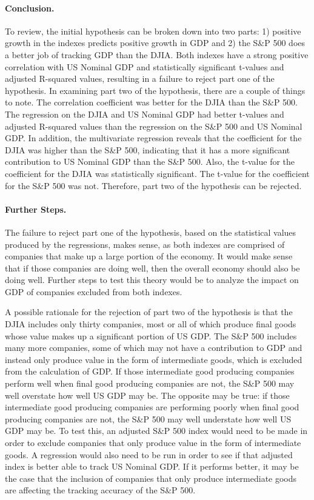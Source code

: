 \documentclass[11pt]{article}
\numberwithin{equation}{section}
\begin{document}
\paragraph{Conclusion.}
To review, the initial hypothesis can be broken down into two parts: 1) positive growth in the indexes predicts positive growth in GDP and 2) the S\&P 500 does a better job of tracking GDP than the DJIA. Both indexes have a strong positive correlation with US Nominal GDP and statistically significant t-values and adjusted R-squared values, resulting in a failure to reject part one of the hypothesis. In examining part two of the hypothesis, there are a couple of things to note. The correlation coefficient was better for the DJIA than the S\&P 500. The regression on the DJIA and US Nominal GDP had better t-values and adjusted R-squared values than the regression on the S\&P 500 and US Nominal GDP. In addition, the multivariate regression reveals that the coefficient for the DJIA was higher than the S\&P 500, indicating that it has a more significant contribution to US Nominal GDP than the S\&P 500. Also, the t-value for the coefficient for the DJIA was statistically significant. The t-value for the coefficient for the S\&P 500 was not. Therefore, part two of the hypothesis can be rejected.

\paragraph{Further Steps.}
The failure to reject part one of the hypothesis, based on the statistical values produced by the regressions, makes sense, as both indexes are comprised of companies that make up a large portion of the economy. It would make sense that if those companies are doing well, then the overall economy should also be doing well. Further steps to test this theory would be to analyze the impact on GDP of companies excluded from both indexes.

A possible rationale for the rejection of part two of the hypothesis is that the DJIA includes only thirty companies, most or all of which produce final goods whose value makes up a significant portion of US GDP. The S\&P 500 includes many more companies, some of which may not have a contribution to GDP and instead only produce value in the form of intermediate goods, which is excluded from the calculation of GDP. If those intermediate good producing companies perform well when final good producing companies are not, the S\&P 500 may well overstate how well US GDP may be. The opposite may be true: if those intermediate good producing companies are performing poorly when final good producing companies are not, the S\&P 500 may well understate how well US GDP may be. To test this, an adjusted S\&P 500 index would need to be made in order to exclude companies that only produce value in the form of intermediate goods. A regression would also need to be run in order to see if that adjusted index is better able to track US Nominal GDP. If it performs better, it may be the case that the inclusion of companies that only produce intermediate goods are affecting the tracking accuracy of the S\&P 500.



\end{document}
